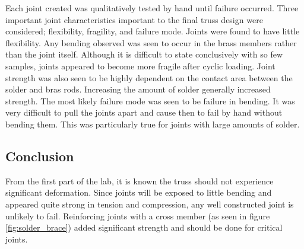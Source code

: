 Each joint created was qualitatively tested by hand until failure occurred.
Three important joint characteristics important to the final truss design were considered; flexibility, fragility, and failure mode.
Joints were found to have little flexibility.
Any bending observed was seen to occur in the brass members rather than the joint itself.
Although it is difficult to state conclusively with so few samples, joints appeared to become more fragile after cyclic loading.
Joint strength was also seen to be highly dependent on the contact area between the solder and bras rods. 
Increasing the amount of solder generally increased strength.
The most likely failure mode was seen to be failure in bending. 
It was very difficult to pull the joints apart and cause then to fail by hand without bending them.
This was particularly true for joints with large amounts of solder.

\subsection{Conclusion}

From the first part of the lab, it is known the truss should not experience significant deformation. 
Since joints will be exposed to little bending and appeared quite strong in tension and compression, any well constructed joint is unlikely to fail.
Reinforcing joints with a cross member (as seen in figure \ref{fig:solder_brace}) added significant strength and should be done for critical joints.

